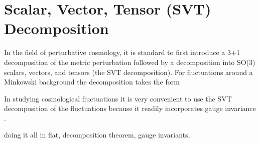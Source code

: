 
\chapter{Scalar, Vector, Tensor (SVT) Decomposition}
\label{c:scalar_vector_tensor_basis}

In the field of perturbative cosmology, it is standard to first introduce a 3+1 decomposition of the metric perturbation followed by a decomposition into SO(3) scalars, vectors, and tensors (the SVT decomposition)\cite{Ellis2012}. For fluctuations around a Minkowski background the decomposition takes the form

In studying cosmological fluctuations it is very convenient to use the SVT decomposition of the fluctuations because it readily incorporates gauge  invariance  \cite{bardeen_1980}.

doing it all in flat, decomposition theorem, gauge invariants, 

